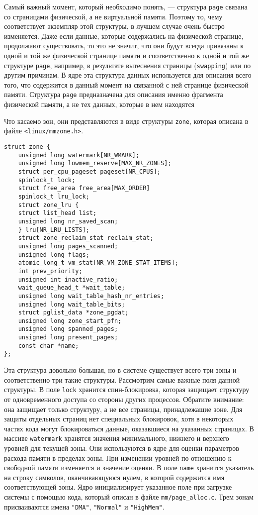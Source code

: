 \documentclass[12pt]{article}
\begin{document}
Самый важный момент, который необходимо понять, — структура \verb!page! связана со
страницами физической, а не виртуальной памяти. Поэтому то, чему соответствует экземпляр этой структуры, в лучшем случае очень быстро изменяется. Даже если данные,
которые содержались на физической странице, продолжают существовать, то это не значит, что они будут всегда привязаны к одной и той же физической странице памяти и соответственно к одной и той же структуре \verb!page!, например, в результате вытеснения
страницы (\verb!swapping!) или по другим причинам. В ядре эта структура данных используется
для описания всего того, что содержится в данный момент на связанной с ней странице
физической памяти. Структура \verb!page! предназначена для описания именно фрагмента физической памяти, а не тех данных, которые в нем находятся

Что касаемо зон, они представляются в виде структуры \verb!zone!, которая описана в файле
\verb!<linux/mmzone.h>!.

\begin{lstlisting}
struct zone {
    unsigned long watermark[NR_WMARK];
    unsigned long lowmem_reserve[MAX_NR_ZONES];
    struct per_cpu_pageset pageset[NR_CPUS];
    spinlock_t lock;
    struct free_area free_area[MAX_ORDER]
    spinlock_t lru_lock;
    struct zone_lru {
    struct list_head list;
    unsigned long nr_saved_scan;
    } lru[NR_LRU_LISTS];
    struct zone_reclaim_stat reclaim_stat;
    unsigned long pages_scanned;
    unsigned long flags;
    atomic_long_t vm_stat[NR_VM_ZONE_STAT_ITEMS];
    int prev_priority;
    unsigned int inactive_ratio;
    wait_queue_head_t *wait_table;
    unsigned long wait_table_hash_nr_entries;
    unsigned long wait_table_bits;
    struct pglist_data *zone_pgdat;
    unsigned long zone_start_pfn;
    unsigned long spanned_pages;
    unsigned long present_pages;
    const char *name;
};
\end{lstlisting}

Эта структура довольно большая, но в системе существует всего три зоны и соответственно три такие структуры. Рассмотрим самые важные поля данной структуры.
В поле \verb!lock! хранится спин-блокировка, которая защищает структуру от одновременного доступа со стороны других процессов. Обратите внимание: она защищает только структуру, а не все страницы, принадлежащие зоне. Для защиты отдельных страниц
нет специальных блокировок, хотя в некоторых частях кода могут блокироваться данные, оказавшиеся на указанных страницах.
В массиве \verb!watermark! хранятся значения минимального, нижнего и верхнего уровней для текущей зоны.
Они используются в ядре для оценки параметров расхода памяти
в пределах зоны. При изменении уровней по отношению к свободной памяти изменяется и значение оценки.
В поле \verb!name! хранится указатель на строку символов, оканчивающуюся нулем, в которой содержится имя соответствующей зоны. 
Ядро инициализирует указанное поле при загрузке системы с помощью кода, который описан в файле \verb!mm/page_alloc.c!.
Трем зонам присваиваются имена \verb!"DMA"!, \verb!"Normal"! и \verb!"HighMem"!.
\pagebreak
\end{document}
